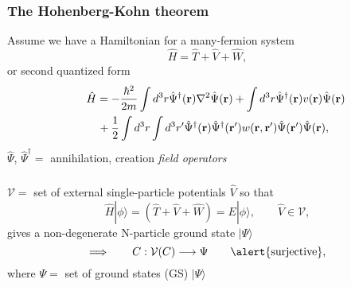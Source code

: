\documentclass[compress]{beamer}
\newcommand*{\ket}[1]{|#1\rangle}
\begin{document}
\frame
{
  \frametitle{The Hohenberg-Kohn theorem}
{\scriptsize
Assume we have a \alert{Hamiltonian} for a  many-fermion system
\[
\hat{H} = \hat{T}+\hat{V}+\hat{W},
\]
or second quantized form
\begin{eqnarray}
\lefteqn{ \hat{H} = -\frac{\hbar^{2}}{2m}\int d^{3}r\hat{\Psi}^{\dagger}(\mathbf{r})\nabla^{2}\hat{\Psi}(\mathbf{r})+\int d^{3}r\hat{\Psi}^{\dagger}(\mathbf{r})v(\mathbf{r})\hat{\Psi}(\mathbf{r}) } \nonumber\\
& & {}+\frac{1}{2}\int d^{3}r\int d^{3}r'\hat{\Psi}^{\dagger}(\mathbf{r})\hat{\Psi}^{\dagger}(\mathbf{r'}) w(\mathbf{r},\mathbf{r'})\hat{\Psi}(\mathbf{r'})\hat{\Psi}(\mathbf{r}),\nonumber
\end{eqnarray}
$\hat{\Psi}$, $\hat{\Psi}^{\dagger } =$ annihilation, creation \emph{field operators}
}
}

\frame
{
  \frametitle{}
\begin{small}
{\scriptsize

$\mathcal{V} =$ set of external single-particle \alert{potentials} $\hat{V}$ so that 
\begin{equation}
\hat{H}\ket{\phi} = \left(\hat{T}+\hat{V}+\hat{W}\right)=E\ket{\phi},\qquad \hat{V}\in \mathcal{V},\nonumber
\end{equation} 
gives a \alert{non-degenerate} N-particle ground state $\ket{\Psi }$
\begin{equation}
  \Longrightarrow \qquad C:\mathcal{V}(C)\longrightarrow \Psi \qquad \text{\alert{surjective},}  \nonumber 
\end{equation}
where $\Psi = $ set of ground states (GS) $\ket{\Psi }$
}
\end{small}
}
\end{document}
